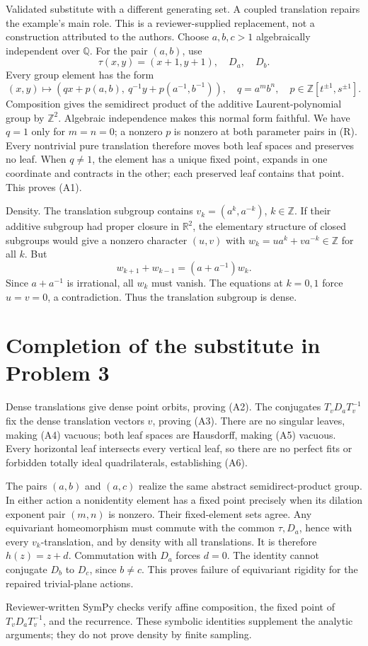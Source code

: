\documentclass[10pt]{article}
\begin{document}
Validated substitute with a different generating set. A coupled translation repairs the example’s main role. This is a reviewer-supplied replacement, not a construction attributed to the authors. Choose \(a,b,c>1\) algebraically independent over \(\mathbb Q\). For the pair \((a,b)\), use \[\tau(x,y)=(x+1,y+1),\quad D_a,\quad D_b .\] Every group element has the form \[(x,y)\longmapsto
 \left(qx+p(a,b),\ q^{-1}y+p(a^{-1},b^{-1})\right),
 \quad q=a^m b^n,\quad p\in\mathbb Z[t^{\pm1},s^{\pm1}].                 \tag{R}\] Composition gives the semidirect product of the additive Laurent-polynomial group by \(\mathbb Z^2\). Algebraic independence makes this normal form faithful. We have \(q=1\) only for \(m=n=0\); a nonzero \(p\) is nonzero at both parameter pairs in (R). Every nontrivial pure translation therefore moves both leaf spaces and preserves no leaf. When \(q\ne1\), the element has a unique fixed point, expands in one coordinate and contracts in the other; each preserved leaf contains that point. This proves (A1).\par
Density. The translation subgroup contains \(v_k=(a^k,a^{-k})\), \(k\in\mathbb Z\). If their additive subgroup had proper closure in \(\mathbb R^2\), the elementary structure of closed subgroups would give a nonzero character \((u,v)\) with \(w_k=u a^k+v a^{-k}\in\mathbb Z\) for all \(k\). But \[w_{k+1}+w_{k-1}=(a+a^{-1})w_k .\] Since \(a+a^{-1}\) is irrational, all \(w_k\) must vanish. The equations at \(k=0,1\) force \(u=v=0\), a contradiction. Thus the translation subgroup is dense.\par
\section*{Completion of the substitute in Problem 3}
Dense translations give dense point orbits, proving (A2). The conjugates \(T_vD_aT_v^{-1}\) fix the dense translation vectors \(v\), proving (A3). There are no singular leaves, making (A4) vacuous; both leaf spaces are Hausdorff, making (A5) vacuous. Every horizontal leaf intersects every vertical leaf, so there are no perfect fits or forbidden totally ideal quadrilaterals, establishing (A6).\par
The pairs \((a,b)\) and \((a,c)\) realize the same abstract semidirect-product group. In either action a nonidentity element has a fixed point precisely when its dilation exponent pair \((m,n)\) is nonzero. Their fixed-element sets agree. Any equivariant homeomorphism must commute with the common \(\tau,D_a\), hence with every \(v_k\)-translation, and by density with all translations. It is therefore \(h(z)=z+d\). Commutation with \(D_a\) forces \(d=0\). The identity cannot conjugate \(D_b\) to \(D_c\), since \(b\ne c\). This proves failure of equivariant rigidity for the repaired trivial-plane actions.\par
Reviewer-written SymPy checks verify affine composition, the fixed point of \(T_vD_aT_v^{-1}\), and the recurrence. These symbolic identities supplement the analytic arguments; they do not prove density by finite sampling.\par
\end{document}
